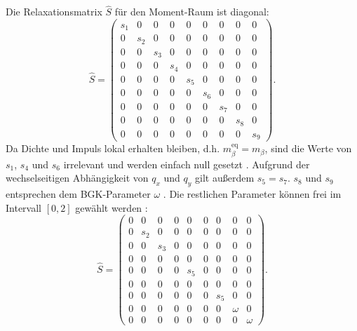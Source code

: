 \documentclass[a4paper,10pt]{scrreprt}
\begin{document}
Die Relaxationsmatrix $\hat{S}$ für den Moment-Raum ist diagonal: 
\begin{equation}
 \hat{S} = \left( \begin{matrix}
       s_1 & 0   & 0   & 0   & 0   & 0   & 0   & 0   & 0   \\
       0   & s_2 & 0   & 0   & 0   & 0   & 0   & 0   & 0   \\
       0   & 0   & s_3 & 0   & 0   & 0   & 0   & 0   & 0   \\
       0   & 0   & 0   & s_4 & 0   & 0   & 0   & 0   & 0   \\
       0   & 0   & 0   & 0   & s_5 & 0   & 0   & 0   & 0   \\
       0   & 0   & 0   & 0   & 0   & s_6 & 0   & 0   & 0   \\
       0   & 0   & 0   & 0   & 0   & 0   & s_7 & 0   & 0   \\
       0   & 0   & 0   & 0   & 0   & 0   & 0   & s_8 & 0   \\
       0   & 0   & 0   & 0   & 0   & 0   & 0   & 0   & s_9
\end{matrix} \right).
\end{equation}
Da Dichte und Impuls lokal erhalten bleiben, d.h. $m^{\text{eq}}_{\beta} = m_{\beta}$, sind die Werte von $s_1$, $s_4$ und $s_6$ irrelevant und werden einfach null gesetzt \cite{2002}. Aufgrund der wechselseitigen Abhängigkeit von $q_x$ und $q_y$ gilt außerdem $s_5 = s_7$. 
$s_8$ und $s_9$ entsprechen dem BGK-Parameter $\omega$ \cite{McCracken2005,Yu2010}. Die restlichen Parameter können frei im Intervall $[0,2]$ gewählt werden \cite{Tolke2006}:
\begin{equation}
 \hat{S} = \left( \begin{matrix}
       0   & 0   & 0   & 0   & 0   & 0   & 0   & 0   & 0   \\
       0   & s_2 & 0   & 0   & 0   & 0   & 0   & 0   & 0   \\
       0   & 0   & s_3 & 0   & 0   & 0   & 0   & 0   & 0   \\
       0   & 0   & 0   & 0   & 0   & 0   & 0   & 0   & 0   \\
       0   & 0   & 0   & 0   & s_5 & 0   & 0   & 0   & 0   \\
       0   & 0   & 0   & 0   & 0   & 0   & 0   & 0   & 0   \\
       0   & 0   & 0   & 0   & 0   & 0   & s_5 & 0   & 0   \\
       0   & 0   & 0   & 0   & 0   & 0   & 0   & \omega & 0   \\
       0   & 0   & 0   & 0   & 0   & 0   & 0   & 0   & \omega
\end{matrix} \right).
\end{equation}
\end{document}
